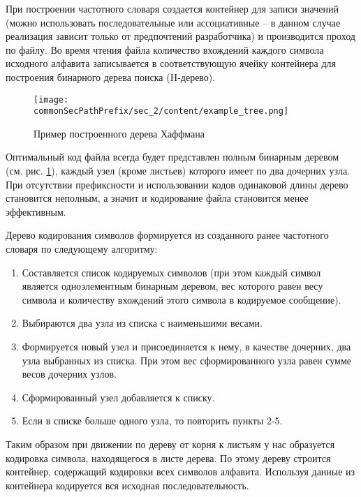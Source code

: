 При построении частотного словаря создается контейнер\cite{lafore} для записи значений (можно использовать последовательные или ассоциативные -- в данном случае реализация зависит только от предпочтений разработчика) и производится проход по файлу.
Во время чтения файла количество вхождений каждого символа исходного алфавита записывается в соответствующую ячейку контейнера для построения бинарного дерева поиска (H-дерево)\cite{algo}.

\begin{figure}[h]
    \centering
    \texttt{[image: \\commonSecPathPrefix/sec\_2/content/example\_tree.png]}
    \caption{Пример построенного дерева Хаффмана}
    \label{fig:exmple_htree}
\end{figure}



Оптимальный код файла всегда будет представлен полным бинарным деревом (см. рис. \ref{fig:exmple_htree}), каждый узел (кроме листьев) которого имеет по два дочерних узла.
При отсутствии префиксности и использовании кодов одинаковой длины дерево становится неполным\cite{algo}, а значит и кодирование файла становится менее эффективным.



Дерево кодирования символов формируется из созданного ранее частотного словаря по следующему алгоритму:
\begin{enumerate}
    \item[1] Составляется список кодируемых символов (при этом каждый символ является одноэлементным бинарным деревом, вес которого равен весу символа и количеству вхождений этого символа в кодируемое сообщение).    
    \item[2] Выбираются два узла из списка с наименьшими весами.
    \item[3] Формируется новый узел и присоединяется к нему, в качестве дочерних, два узла выбранных из списка. При этом вес сформированного узла равен сумме весов дочерних узлов.
    \item[4] Сформированный узел добавляется к списку.
    \item[5] Если в списке больше одного узла, то повторить пункты 2-5.
\end{enumerate}



Таким образом при движении по дереву от корня к листьям у нас образуется кодировка символа, находящегося в листе дерева.
По этому дереву строится контейнер, содержащий кодировки всех символов алфавита.
Используя данные из контейнера кодируется вся исходная последовательность.



